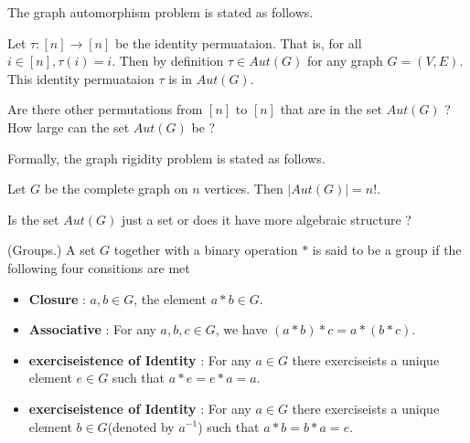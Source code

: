 The graph automorphism problem is stated as follows. 
\begin{center}
\end{center}



\begin{observation}
Let $\tau:[n]\rightarrow[n]$ be the identity permuataion. That is, for all $i\in[n],\tau(i)=i$. Then by definition $\tau\in Aut(G)$ for any graph $G=(V,E)$. This identity permuataion $\tau$ is in $Aut(G)$. 
\end{observation}


Are there other permutations from $[n]$ to $[n]$ that are in the set $Aut(G)$ ? How large can the set $Aut(G)$ be ?

Formally, the graph rigidity problem is stated as follows.
\begin{center}
\end{center}

\begin{observation}
Let $G$ be the complete graph on $n$ vertices. Then $|Aut(G)|=n!$.  
\end{observation}

Is the set $Aut(G)$ just a set or does it have more algebraic structure ? 

\begin{definition}(Groups.)
A set $G$ together with a binary operation $*$ is said to be a group if the following four consitions are met
\begin{itemize}
\item \textbf{Closure} : $a,b\in G$, the element $a*b\in G$.
\item \textbf{Associative} : For any $a,b,c\in G$, we have $(a*b)*c = a*(b*c)$.
\item \textbf{exerciseistence of Identity} : For any $a\in G$ there exerciseists a unique element $e\in G$ such that $a*e =e*a =a$. 
\item \textbf{exerciseistence of Identity} : For any $a\in G$ there exerciseists a unique element $b\in G$(denoted by $a^{-1}$) such that $a*b =b*a =e$. 
\end{itemize}
\end{definition}

